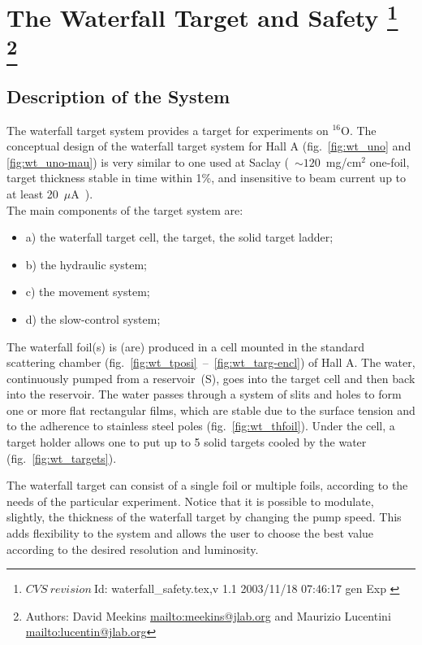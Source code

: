 \chapter[The Waterfall Target and Safety]{The Waterfall Target and Safety
\footnote{
  $CVS~revision~ $Id: waterfall_safety.tex,v 1.1 2003/11/18 07:46:17 gen Exp $ $
}
\footnote{Authors: David Meekins \url{mailto:meekins@jlab.org} and 
 Maurizio Lucentini \url{mailto:lucentin@jlab.org}}
}

\section{Description of the System}

The waterfall target system provides a target for experiments on $^{16}$O.
The conceptual design of the waterfall target system for Hall A (fig.~\ref{fig:wt_uno}
and \ref{fig:wt_uno-mau}) is very similar to one used at Saclay (~$\sim 120$~mg/cm$^{2}$
one-foil, target thickness stable in time within 1\%, and insensitive
to beam current up to at least 20~$\mu $A~\cite{Garibaldi:1992mb}).\\


The main components of the target system are: 

\begin{itemize}
\item a) the waterfall target cell, the target, the solid target ladder; 
\item b) the hydraulic system; 
\item c) the movement system; 
\item d) the slow-control system; 
\end{itemize}
The waterfall foil(s) is (are) produced in a cell mounted in the standard
scattering chamber (fig.~\ref{fig:wt_tposi}~--~\ref{fig:wt_targ-encl}) of Hall
A. The water, continuously pumped from a reservoir~(S), goes into
the target cell and then back into the reservoir. The water passes
through a system of slits and holes to form one or more flat rectangular
films, which are stable due to the surface tension and to the adherence
to stainless steel poles (fig.~\ref{fig:wt_thfoil}). Under the cell, a
target holder allows one to put up to 5 solid targets cooled by the
water (fig.~\ref{fig:wt_targets}).

The waterfall target can consist of a single foil or multiple foils,
according to the needs of the particular experiment. Notice that it
is possible to modulate, slightly, the thickness of the waterfall
target by changing the pump speed. This adds flexibility to the system
and allows the user to choose the best value according to the desired
resolution and luminosity.

